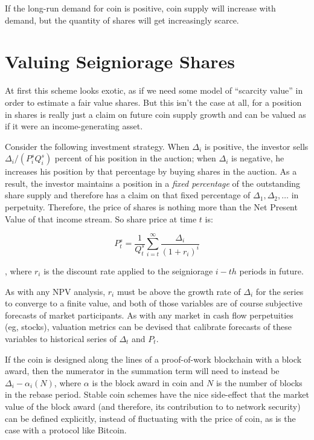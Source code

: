 \documentclass[twocolumn]{article}
\begin{document}
If the long-run demand for coin is positive, coin supply will increase
with demand, but the quantity of shares will get increasingly
scarce.

\section*{Valuing Seigniorage Shares}
At first this scheme looks exotic, as if we need some model of
``scarcity value'' in order to estimate a fair value shares. But this
isn't the case at all, for a position in shares is really just a claim
on future coin supply growth and can be valued as if it were an
income-generating asset.

Consider the following investment strategy. When $\Delta_{i}$ is
positive, the investor sells $\Delta_{i}/(P^{s}_{i}Q^{s}_{i})$ percent
of his position in the auction; when $\Delta_{i}$ is negative, he
increases his position by that percentage by buying shares in the
auction. As a result, the investor maintains a position in a
\emph{fixed percentage} of the outstanding share supply and therefore
has a claim on that fixed percentage of $\Delta_{1}, \Delta_{2},\dots$
in perpetuity. Therefore, the price of shares is nothing more than the
Net Present Value of that income stream. So share price at time $t$
is:

\begin{equation}
\label{eqn:npv}
P^{s}_{t} = \frac{1}{Q^{s}_{t}}\sum\limits_{i=t}^{\infty}\frac{\Delta_{i}}{(1+r_{i})^{i}}
\end{equation}

, where $r_{i}$ is the discount rate applied to the seigniorage $i-th$
periods in future. 

As with any NPV analysis, $r_{i}$ must be above the growth rate of
$\Delta_{i}$ for the series to converge to a finite value, and both of
those variables are of course subjective forecasts of market
participants. As with any market in cash flow perpetuities (eg,
stocks), valuation metrics can be devised that calibrate forecasts of
these variables to historical series of $\Delta_{t}$ and $P_{t}$. 

If the coin is designed along the lines of a proof-of-work blockchain
with a block award, then the numerator in the summation term will
need to instead be $\Delta_{i} - \alpha_{i}(N)$, where $\alpha$ is the
block award in coin and $N$ is the number of blocks in the rebase
period. Stable coin schemes have the nice side-effect that the market
value of the block award (and therefore, its contribution to to
network security) can be defined explicitly, instead of fluctuating
with the price of coin, as is the case with a protocol like Bitcoin.
\end{document}
